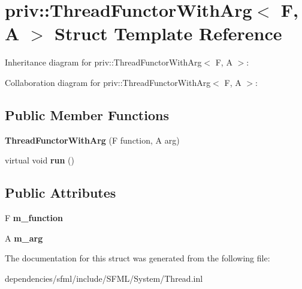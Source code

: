 \hypertarget{structpriv_1_1_thread_functor_with_arg}{}\section{priv\+:\+:Thread\+Functor\+With\+Arg$<$ F, A $>$ Struct Template Reference}
\label{structpriv_1_1_thread_functor_with_arg}


Inheritance diagram for priv\+:\+:Thread\+Functor\+With\+Arg$<$ F, A $>$\+:


Collaboration diagram for priv\+:\+:Thread\+Functor\+With\+Arg$<$ F, A $>$\+:
\subsection*{Public Member Functions}
\begin{DoxyCompactItemize}
\item 
\mbox{\label{structpriv_1_1_thread_functor_with_arg_ae3745753b77880cdfda6f10d72748efa}} 
{\bfseries Thread\+Functor\+With\+Arg} (F function, A arg)
\item 
\mbox{\label{structpriv_1_1_thread_functor_with_arg_a0f8bb6ba36819e80016528bab8b0bd4f}} 
virtual void {\bfseries run} ()
\end{DoxyCompactItemize}
\subsection*{Public Attributes}
\begin{DoxyCompactItemize}
\item 
\mbox{\label{structpriv_1_1_thread_functor_with_arg_ab12992af3112f15df4b6f0dbce3137b9}} 
F {\bfseries m\+\_\+function}
\item 
\mbox{\label{structpriv_1_1_thread_functor_with_arg_ac598f7701f976320bc3964733b9ae9ae}} 
A {\bfseries m\+\_\+arg}
\end{DoxyCompactItemize}


The documentation for this struct was generated from the following file\+:\begin{DoxyCompactItemize}
\item 
dependencies/sfml/include/\+S\+F\+M\+L/\+System/Thread.\+inl\end{DoxyCompactItemize}
